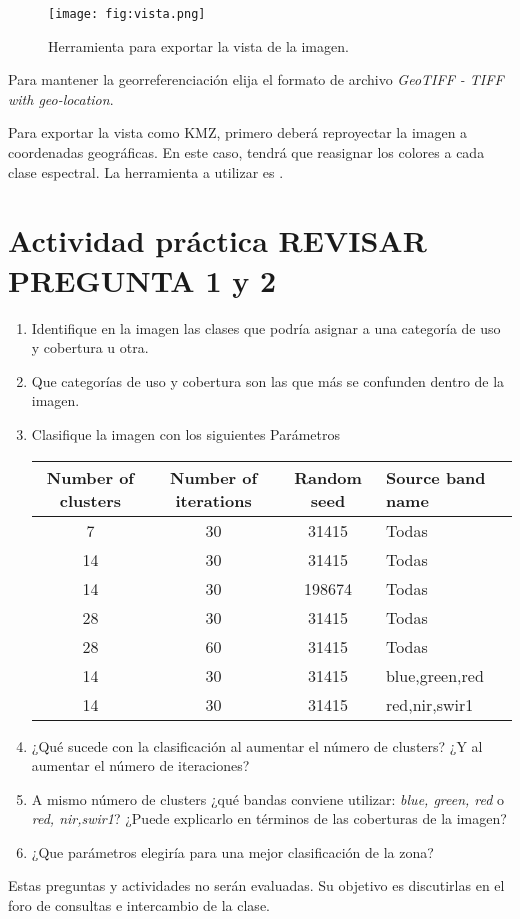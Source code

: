 \begin{figure}[h!]
    \centering
    \texttt{[image: fig:vista.png]}
    \caption{Herramienta para exportar la vista de la imagen.}
    \label{fig:vista}
\end{figure}

Para mantener la georreferenciación elija el formato de archivo \emph{GeoTIFF - TIFF with geo-location}.

Para exportar la vista como KMZ, primero deberá reproyectar la imagen a coordenadas geográficas. En este caso, tendrá que reasignar los colores a cada clase espectral. La herramienta a utilizar es .


\section{Actividad práctica REVISAR PREGUNTA 1 y 2}

\begin{enumerate}
  \item Identifique en la imagen las clases que podría asignar a una categoría de uso y cobertura u otra.
  \item Que categorías de uso y cobertura son las que más se confunden dentro de la imagen.
  \item Clasifique la imagen con los siguientes Parámetros
  \begin{table}[h]
  \centering
  \begin{tabular}{cccl}
  \toprule
  Number of clusters & Number of iterations & Random seed & Source band name \\ \midrule
  7                  & 30                   & 31415       & Todas            \\
  14                 & 30                   & 31415       & Todas            \\
  14                 & 30                   & 198674      & Todas            \\
  28                 & 30                   & 31415       & Todas            \\
  28                 & 60                   & 31415       & Todas            \\
  14                 & 30                   & 31415       & blue,green,red   \\
  14                 & 30                   & 31415       & red,nir,swir1    \\ \bottomrule
  \end{tabular}
  \end{table}
  \item ¿Qué sucede con la clasificación al aumentar el número de clusters? ¿Y al aumentar el número de iteraciones?
  \item A mismo número de clusters ¿qué bandas conviene utilizar: \emph{blue, green, red} o \emph{red, nir,swir1}? ¿Puede explicarlo en términos de las coberturas de la imagen?
  \item ¿Que parámetros elegiría para una mejor clasificación de la zona?
\end{enumerate}

Estas preguntas y actividades no serán evaluadas. Su objetivo es discutirlas en el foro de consultas e intercambio de la clase.
